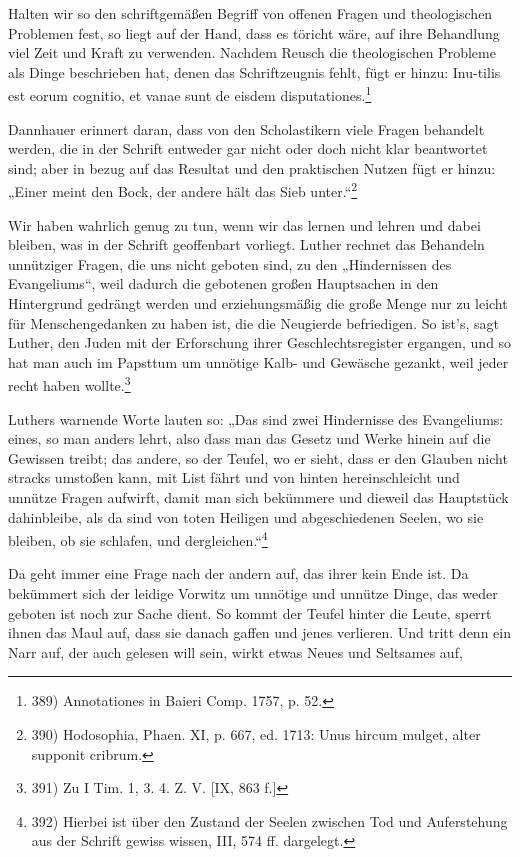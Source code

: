 Halten wir so den schriftgemäßen Begriff von offenen Fragen und theologischen Problemen fest, so liegt auf der Hand, dass es töricht wäre, auf ihre Behandlung viel Zeit und Kraft zu verwenden. Nachdem Reusch die theologischen Probleme als Dinge beschrieben hat, denen das Schriftzeugnis fehlt, fügt er hinzu: Inu-tilis est eorum cognitio, et vanae sunt de eisdem disputationes.\footnote{389) Annotationes in Baieri Comp. 1757, p. 52.}\par Dannhauer erinnert daran, dass von den Scholastikern viele Fragen behandelt werden, die in der Schrift entweder gar nicht oder doch nicht klar beantwortet sind; aber in bezug auf das Resultat und den praktischen Nutzen fügt er hinzu: „Einer meint den Bock, der andere hält das Sieb unter.“\footnote{390) Hodosophia, Phaen. XI, p. 667, ed. 1713: Unus hircum mulget, alter supponit cribrum.}\par Wir haben wahrlich genug zu tun, wenn wir das lernen und lehren und dabei bleiben, was in der Schrift geoffenbart vorliegt. Luther rechnet das Behandeln unnütziger Fragen, die uns nicht geboten sind, zu den „Hindernissen des Evangeliums“, weil dadurch die gebotenen großen Hauptsachen in den Hintergrund gedrängt werden und erziehungsmäßig die große Menge nur zu leicht für Menschengedanken zu haben ist, die die Neugierde befriedigen. So ist's, sagt Luther, den Juden mit der Erforschung ihrer Geschlechtsregister ergangen, und so hat man auch im Papsttum um unnötige Kalb- und Gewäsche gezankt, weil jeder recht haben wollte.\footnote{391) Zu I Tim. 1, 3. 4. Z. V. [IX, 863 f.]}\par Luthers warnende Worte lauten so: „Das sind zwei Hindernisse des Evangeliums: eines, so man anders lehrt, also dass man das Gesetz und Werke hinein auf die Gewissen treibt; das andere, so der Teufel, wo er sieht, dass er den Glauben nicht stracks umstoßen kann, mit List fährt und von hinten hereinschleicht und unnütze Fragen aufwirft, damit man sich bekümmere und dieweil das Hauptstück dahinbleibe, als da sind von toten Heiligen und abgeschiedenen Seelen, wo sie bleiben, ob sie schlafen, und dergleichen.“\footnote{392) Hierbei ist über den Zustand der Seelen zwischen Tod und Auferstehung aus der Schrift gewiss wissen, III, 574 ff. dargelegt.}\par Da geht immer eine Frage nach der andern auf, das ihrer kein Ende ist. Da bekümmert sich der leidige Vorwitz um unnötige und unnütze Dinge, das weder geboten ist noch zur Sache dient. So kommt der Teufel hinter die Leute, sperrt ihnen das Maul auf, dass sie danach gaffen und jenes verlieren. Und tritt denn ein Narr auf, der auch gelesen will sein, wirkt etwas Neues und Seltsames auf,